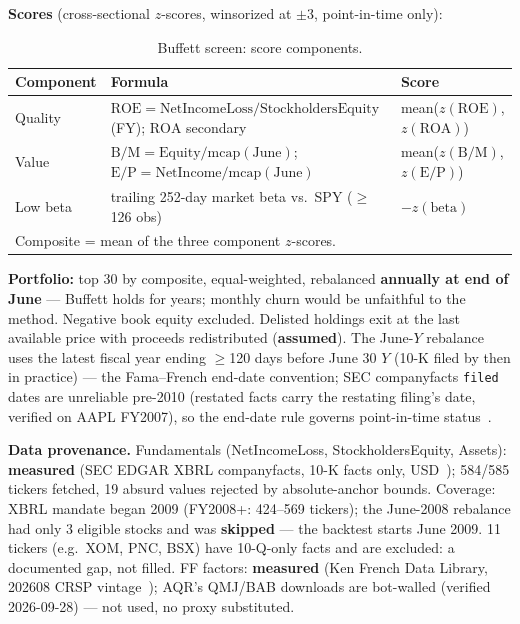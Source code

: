 \documentclass[11pt,a4paper]{article}
\begin{document}
\textbf{Scores} (cross-sectional $z$-scores, winsorized at $\pm3$, point-in-time only):

\begin{table}[h]
\centering
\caption{Buffett screen: score components.}
\label{tab:scores}
\begin{tabular}{lll}
\toprule
Component & Formula & Score \\
\midrule
Quality & $\mathrm{ROE}=\mathrm{NetIncomeLoss}/\mathrm{StockholdersEquity}$ (FY); $\mathrm{ROA}$ secondary & mean($z(\mathrm{ROE})$, $z(\mathrm{ROA})$) \\
Value & $\mathrm{B/M}=\mathrm{Equity}/\mathrm{mcap(June)}$; $\mathrm{E/P}=\mathrm{NetIncome}/\mathrm{mcap(June)}$ & mean($z(\mathrm{B/M})$, $z(\mathrm{E/P})$) \\
Low beta & trailing 252-day market beta vs.\ SPY ($\geq$126 obs) & $-z(\mathrm{beta})$ \\
\midrule
\multicolumn{3}{l}{Composite = mean of the three component $z$-scores.} \\
\bottomrule
\end{tabular}
\end{table}

\textbf{Portfolio:} top 30 by composite, equal-weighted, rebalanced \textbf{annually at end of June} --- Buffett holds for years; monthly churn would be unfaithful to the method. Negative book equity excluded. Delisted holdings exit at the last available price with proceeds redistributed (\textbf{assumed}). The June-$Y$ rebalance uses the latest fiscal year ending $\geq$120 days before June 30 $Y$ (10-K filed by then in practice) --- the Fama--French end-date convention; SEC companyfacts \texttt{filed} dates are unreliable pre-2010 (restated facts carry the restating filing's date, verified on AAPL FY2007), so the end-date rule governs point-in-time status~\cite{sec}.

\textbf{Data provenance.} Fundamentals (NetIncomeLoss, StockholdersEquity, Assets): \textbf{measured} (SEC EDGAR XBRL companyfacts, 10-K facts only, USD~\cite{sec}); 584/585 tickers fetched, 19 absurd values rejected by absolute-anchor bounds. Coverage: XBRL mandate began 2009 (FY2008+: 424--569 tickers); the June-2008 rebalance had only 3 eligible stocks and was \textbf{skipped} --- the backtest starts June 2009. 11 tickers (e.g.\ XOM, PNC, BSX) have 10-Q-only facts and are excluded: a documented gap, not filled. FF factors: \textbf{measured} (Ken French Data Library, 202608 CRSP vintage~\cite{FF}); AQR's QMJ/BAB downloads are bot-walled (verified 2026-09-28) --- not used, no proxy substituted.
\end{document}
